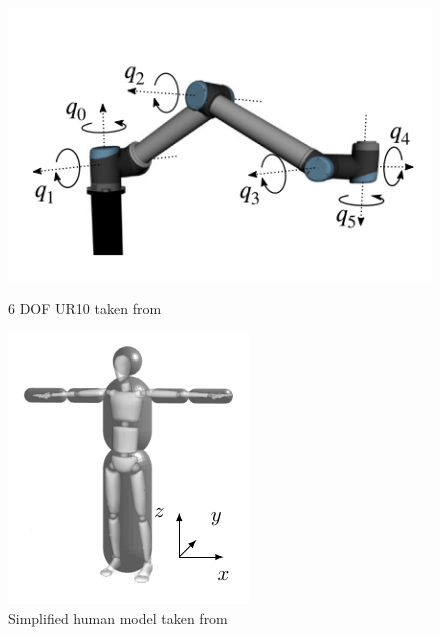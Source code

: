 \begin{figure}[!htbp]
    \centering
    \begin{minipage}[b]{0.45\columnwidth}
        \includegraphics[width=\textwidth]{images/ur10.png}
        \caption{6 DOF UR10 taken from \parencite{max}}
        \label{fig:ur10}
    \end{minipage}
    \hfill
    \begin{minipage}[b]{0.35\columnwidth}
        \includegraphics[width=\textwidth]{images/overlayedHuman.pdf}
        \caption{Simplified human model taken from \parencite{renz1}} 
        \label{fig:reduced12}
    \end{minipage}
    \vspace{0.2cm} %
\end{figure}


